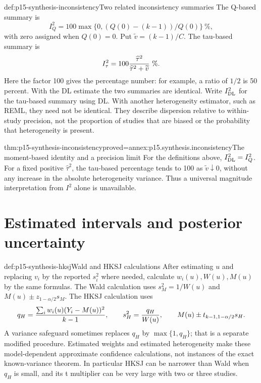 \begin{hbdefinition}{def:p15-synthesis-inconsistency}{Two related inconsistency summaries}
The Q-based summary is
\[
 I_Q^2=100\max\{0,(Q(0)-(k-1))/Q(0)\}\ \%,
\]
with zero assigned when \(Q(0)=0\). Put
\(\widetilde v=(k-1)/C\). The tau-based summary is
\[
 I_\tau^2=100{\widehat\tau^2\over\widehat\tau^2+\widetilde v}\ \%.
\]
Here the factor 100 gives the percentage number: for example, a ratio of
\(1/2\) is 50 percent. With the DL estimate the two summaries are identical.
Write \(I_{\rm DL}^2\) for the tau-based summary using DL.
With another heterogeneity estimator, such as REML, they need not be identical.
They describe dispersion relative to within-study precision, not the proportion
of studies that are biased or the probability that heterogeneity is present.
\end{hbdefinition}

\begin{hblemma}{thm:p15-synthesis-inconsistency}{proved=annex:p15.synthesis.inconsistency}{The moment-based identity and a precision limit}
For the definitions above, \(I_{\rm DL}^2=I_Q^2\). For a fixed
positive \(\widehat\tau^2\), the tau-based percentage tends to 100
as \(\widetilde v\downarrow0\), without any increase in the absolute
heterogeneity variance. Thus a universal magnitude interpretation from
\(I^2\) alone is unavailable.
\end{hblemma}

\section{Estimated intervals and posterior uncertainty}
\label{sec:p15-synthesis-intervals}

\begin{hbdefinition}{def:p15-synthesis-hksj}{Wald and HKSJ calculations}
After estimating \(u\) and replacing \(v_i\) by the reported
\(s_i^2\) where needed, calculate \(w_i(u),W(u),M(u)\) by the
same formulas. The Wald calculation uses \(s_M^2=1/W(u)\) and
\(M(u)\pm z_{1-\alpha/2}s_M\). The HKSJ calculation uses
\[
 q_H={\sum_iw_i(u)(Y_i-M(u))^2\over k-1},\qquad
 s_H^2={q_H\over W(u)},\qquad
 M(u)\pm t_{k-1,1-\alpha/2}s_H.
\]
A variance safeguard sometimes replaces \(q_H\) by \(\max\{1,q_H\}\);
that is a separate modified procedure. Estimated weights and estimated
heterogeneity make these model-dependent approximate confidence calculations,
not instances of the exact known-variance theorem. In particular HKSJ can
be narrower than Wald when \(q_H\) is small, and its t multiplier can be
very large with two or three studies.
\end{hbdefinition}

